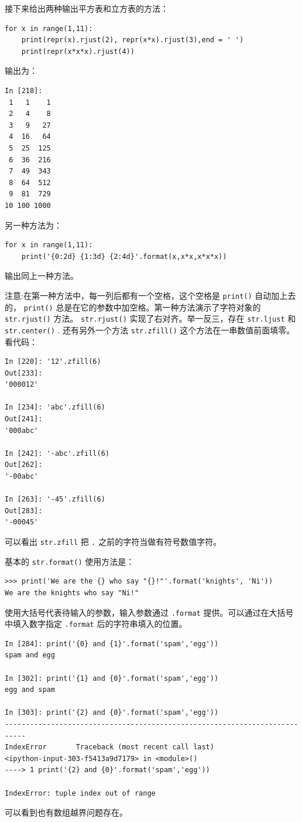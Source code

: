 \documentclass[10pt,a4paper,UTF8]{article}
\begin{document}
接下来给出两种输出平方表和立方表的方法：
\lstset{language=Python,label= ,caption= ,captionpos=b,numbers=none}
\begin{lstlisting}
for x in range(1,11):
    print(repr(x).rjust(2), repr(x*x).rjust(3),end = ' ')
    print(repr(x*x*x).rjust(4))
\end{lstlisting}

输出为：
\begin{verbatim}
In [218]:
 1   1    1
 2   4    8
 3   9   27
 4  16   64
 5  25  125
 6  36  216
 7  49  343
 8  64  512
 9  81  729
10 100 1000
\end{verbatim}
另一种方法为：
\lstset{language=Python,label= ,caption= ,captionpos=b,numbers=none}
\begin{lstlisting}
for x in range(1,11):
    print('{0:2d} {1:3d} {2:4d}'.format(x,x*x,x*x*x))
\end{lstlisting}
输出同上一种方法。

注意:在第一种方法中，每一列后都有一个空格，这个空格是 \texttt{print()} 自动加上去的， \texttt{print()} 总是在它的参数中加空格。第一种方法演示了字符对象的 \texttt{str.rjust()} 方法。 \texttt{str.rjust()} 实现了右对齐。举一反三，存在 \texttt{str.ljust} 和 \texttt{str.center()} . 还有另外一个方法 \texttt{str.zfill()} 这个方法在一串数值前面填零。看代码：

\lstset{language=Python,label= ,caption= ,captionpos=b,numbers=none}
\begin{lstlisting}
In [220]: '12'.zfill(6)
Out[233]: 
'000012'

In [234]: 'abc'.zfill(6)
Out[241]: 
'000abc'

In [242]: '-abc'.zfill(6)
Out[262]: 
'-00abc'

In [263]: '-45'.zfill(6)
Out[283]: 
'-00045'
\end{lstlisting}

可以看出 \texttt{str.zfill} 把 \texttt{.} 之前的字符当做有符号数值字符。

基本的 \texttt{str.format()} 使用方法是：
\begin{verbatim}
>>> print('We are the {} who say "{}!"'.format('knights', 'Ni'))
We are the knights who say "Ni!"
\end{verbatim}

使用大括号代表待输入的参数，输入参数通过 \texttt{.format} 提供。可以通过在大括号中填入数字指定 \texttt{.format} 后的字符串填入的位置。

\lstset{language=Python,label= ,caption= ,captionpos=b,numbers=none}
\begin{lstlisting}
In [284]: print('{0} and {1}'.format('spam','egg'))
spam and egg

In [302]: print('{1} and {0}'.format('spam','egg'))
egg and spam

In [303]: print('{2} and {0}'.format('spam','egg'))
---------------------------------------------------------------------------
IndexError       Traceback (most recent call last)
<ipython-input-303-f5413a9d7179> in <module>()
----> 1 print('{2} and {0}'.format('spam','egg'))

IndexError: tuple index out of range
\end{lstlisting}
可以看到也有数组越界问题存在。
\end{document}
